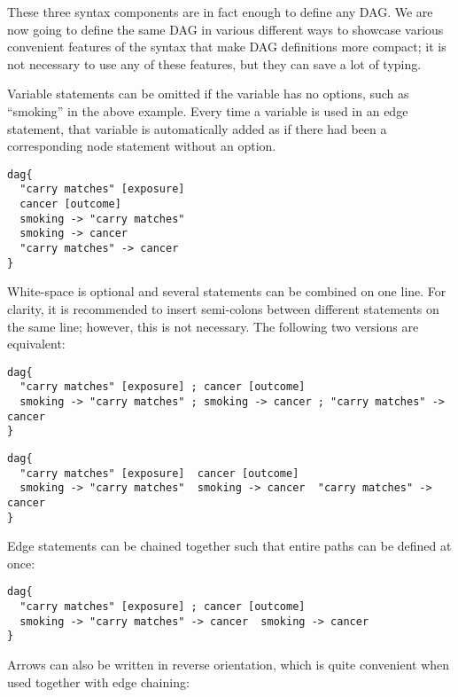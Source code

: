 \documentclass[a4paper]{article} %
\makeatletter
\newenvironment{kframe}{%
 \def\at@end@of@kframe{}%
 \ifinner\ifhmode%
  \def\at@end@of@kframe{\end{minipage}}%
  \begin{minipage}{\columnwidth}%
 \fi\fi%
 \def\FrameCommand##1{\hskip\@totalleftmargin \hskip-\fboxsep
 \colorbox{shadecolor}{##1}\hskip-\fboxsep
     \hskip-\linewidth \hskip-\@totalleftmargin \hskip\columnwidth}%
 \MakeFramed {\advance\hsize-\width
   \@totalleftmargin\z@ \linewidth\hsize
   \@setminipage}}%
 {\par\unskip\endMakeFramed%
 \at@end@of@kframe}
\makeatother
\begin{document}
These three syntax components are in fact enough to define any DAG. We are now going to define the same DAG in various different ways to showcase various convenient features of the syntax that make DAG definitions more compact; it is not necessary to use any of these features, but they can save a lot of typing.

Variable statements can be omitted if the variable has no options, such as ``smoking'' in the above example. Every time a variable is used in an edge statement, that variable is automatically added as if there had been a corresponding node statement without an option.

\begin{kframe}
\begin{verbatim}
dag{ 
  "carry matches" [exposure]
  cancer [outcome]
  smoking -> "carry matches"
  smoking -> cancer
  "carry matches" -> cancer
}
\end{verbatim}
\end{kframe}


White-space is optional and several statements can be combined on one line. For clarity, it is recommended to insert semi-colons between different statements on the same line; however, this is not necessary. The following two versions are equivalent:

\begin{kframe}
\begin{verbatim}
dag{ 
  "carry matches" [exposure] ; cancer [outcome]
  smoking -> "carry matches" ; smoking -> cancer ; "carry matches" -> cancer
}
\end{verbatim}
\end{kframe}
\begin{kframe}
\begin{verbatim}
dag{ 
  "carry matches" [exposure]  cancer [outcome]
  smoking -> "carry matches"  smoking -> cancer  "carry matches" -> cancer
}
\end{verbatim}
\end{kframe}


Edge statements can be chained together such that entire paths can be defined at once:

\begin{kframe}
\begin{verbatim}
dag{ 
  "carry matches" [exposure] ; cancer [outcome]
  smoking -> "carry matches" -> cancer  smoking -> cancer
}
\end{verbatim}
\end{kframe}

Arrows can also be written in reverse orientation, which is quite convenient when used together with edge chaining:
\end{document}
